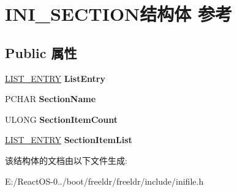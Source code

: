 \hypertarget{struct_i_n_i___s_e_c_t_i_o_n}{}\section{I\+N\+I\+\_\+\+S\+E\+C\+T\+I\+O\+N结构体 参考}
\label{struct_i_n_i___s_e_c_t_i_o_n}
\subsection*{Public 属性}
\begin{DoxyCompactItemize}
\item 
\mbox{\label{struct_i_n_i___s_e_c_t_i_o_n_a83c9744ca4114597035e2657aa898ddc}} 
\hyperlink{struct___l_i_s_t___e_n_t_r_y}{L\+I\+S\+T\+\_\+\+E\+N\+T\+RY} {\bfseries List\+Entry}
\item 
\mbox{\label{struct_i_n_i___s_e_c_t_i_o_n_afca7a9d089ccf8e49d0fa447c7cddef9}} 
P\+C\+H\+AR {\bfseries Section\+Name}
\item 
\mbox{\label{struct_i_n_i___s_e_c_t_i_o_n_a26daf1bdfec0f6ce2216765cbfa97abd}} 
U\+L\+O\+NG {\bfseries Section\+Item\+Count}
\item 
\mbox{\label{struct_i_n_i___s_e_c_t_i_o_n_ae7f92f849a250a8901fa66a65564ff73}} 
\hyperlink{struct___l_i_s_t___e_n_t_r_y}{L\+I\+S\+T\+\_\+\+E\+N\+T\+RY} {\bfseries Section\+Item\+List}
\end{DoxyCompactItemize}


该结构体的文档由以下文件生成\+:\begin{DoxyCompactItemize}
\item 
E\+:/\+React\+O\+S-\/0../boot/freeldr/freeldr/include/inifile.\+h\end{DoxyCompactItemize}
